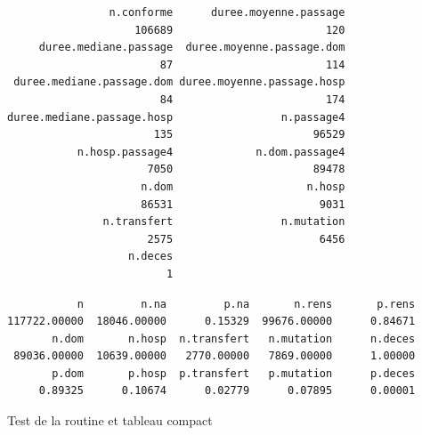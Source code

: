 \documentclass[]{article}
\begin{document}
\begin{verbatim}
                n.conforme      duree.moyenne.passage 
                    106689                        120 
     duree.mediane.passage  duree.moyenne.passage.dom 
                        87                        114 
 duree.mediane.passage.dom duree.moyenne.passage.hosp 
                        84                        174 
duree.mediane.passage.hosp                 n.passage4 
                       135                      96529 
           n.hosp.passage4             n.dom.passage4 
                      7050                      89478 
                     n.dom                     n.hosp 
                     86531                       9031 
               n.transfert                 n.mutation 
                      2575                       6456 
                   n.deces 
                         1 
\end{verbatim}

\begin{verbatim}
           n         n.na         p.na       n.rens       p.rens 
117722.00000  18046.00000      0.15329  99676.00000      0.84671 
       n.dom       n.hosp  n.transfert   n.mutation      n.deces 
 89036.00000  10639.00000   2770.00000   7869.00000      1.00000 
       p.dom       p.hosp  p.transfert   p.mutation      p.deces 
     0.89325      0.10674      0.02779      0.07895      0.00001 
\end{verbatim}

Test de la routine et tableau compact
\end{document}
